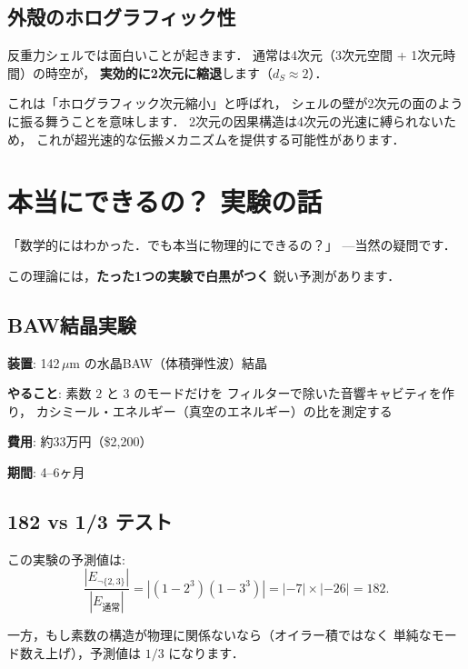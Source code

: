 \documentclass[11pt,a4paper]{article}
\begin{document}
\subsection{外殻のホログラフィック性}

反重力シェルでは面白いことが起きます．
通常は4次元（3次元空間 + 1次元時間）の時空が，
\textbf{実効的に2次元に縮退}します（$d_S \approx 2$）．

これは「ホログラフィック次元縮小」と呼ばれ，
シェルの壁が2次元の面のように振る舞うことを意味します．
2次元の因果構造は4次元の光速に縛られないため，
これが超光速的な伝搬メカニズムを提供する可能性があります．

\section{本当にできるの？ 実験の話}

「数学的にはわかった．でも本当に物理的にできるの？」
---当然の疑問です．

この理論には，\textbf{たった1つの実験で白黒がつく}
鋭い予測があります．

\subsection{BAW結晶実験}

\begin{tcolorbox}[colback=yellow!5,colframe=yellow!60!black,title=実験の概要]
\textbf{装置}: 142\,$\mu$m の水晶BAW（体積弾性波）結晶

\textbf{やること}: 素数 $2$ と $3$ のモードだけを
フィルターで除いた音響キャビティを作り，
カシミール・エネルギー（真空のエネルギー）の比を測定する

\textbf{費用}: 約33万円（\$2{,}200）

\textbf{期間}: 4--6ヶ月
\end{tcolorbox}

\subsection{182 vs 1/3 テスト}

この実験の予測値は:
\begin{equation}
  \frac{|E_{\neg\{2,3\}}|}{|E_{\text{通常}}|}
  = |(1 - 2^3)(1 - 3^3)| = |{-7}| \times |{-26}| = 182.
\end{equation}

一方，もし素数の構造が物理に関係ないなら（オイラー積ではなく
単純なモード数え上げ），予測値は $1/3$ になります．
\end{document}
